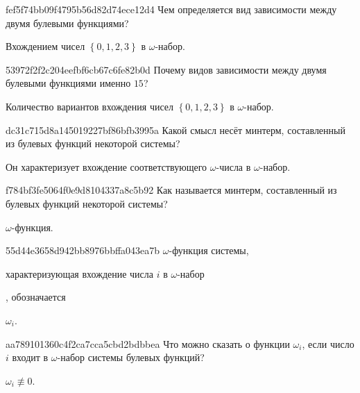 \begin{note}{fef5f74bb09f4795b56d82d74ece12d4}
    Чем определяется вид зависимости между двумя булевыми функциями?

    \begin{cloze}{1}
        Вхождением чисел \({ \left\{ 0, 1, 2, 3 \right\} }\) в \({ \omega }\)-набор.
    \end{cloze}
\end{note}

\begin{note}{53972f2f2c204eefbf6cb67c6fe82b0d}
    Почему видов зависимости между двумя булевыми функциями именно \({ 15 }\)?

    \begin{cloze}{1}
        Количество вариантов вхождения чисел \({ \left\{ 0, 1, 2, 3 \right\} }\) в \({ \omega }\)-набор.
    \end{cloze}
\end{note}

\begin{note}{dc31c715d8a145019227bf86bfb3995a}
    Какой смысл несёт минтерм, составленный из булевых функций некоторой системы?

    \begin{cloze}{1}
        Он характеризует вхождение соответствующего \({ \omega }\)-числа в \({ \omega }\)-набор.
    \end{cloze}
\end{note}

\begin{note}{f784bf3fe5064f0e9d8104337a8c5b92}
    Как называется минтерм, составленный из булевых функций некоторой системы?

    \begin{cloze}{1}
        \({ \omega }\)-функция.
    \end{cloze}
\end{note}

\begin{note}{55d44e3658d942bb8976bbffa043ea7b}
    \({ \omega }\)-функция системы, \begin{icloze}{2}характеризующая вхождение числа \({ i }\) в \({ \omega }\)-набор\end{icloze}, обозначается \begin{icloze}{1}\({ \omega_i }\).\end{icloze}
\end{note}

\begin{note}{aa789101360c4f2ca7cca5cbd2bdbbea}
    Что можно сказать о функции \({ \omega_i }\), если число \({ i }\) входит в \({ \omega }\)-набор системы булевых функций?

    \begin{cloze}{1}
        \({ \omega_i \not\equiv 0 }\).
    \end{cloze}
\end{note}

